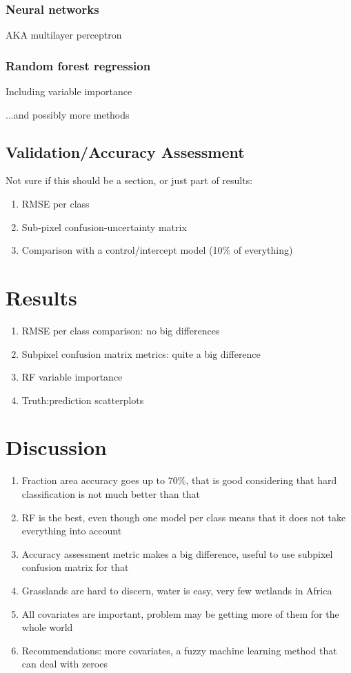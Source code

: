 \documentclass[a4paper,10pt]{article}
\begin{document}
\subsubsection{Neural networks}

AKA multilayer perceptron

\subsubsection{Random forest regression}

Including variable importance

...and possibly more methods

\subsection{Validation/Accuracy Assessment}

Not sure if this should be a section, or just part of results:

\begin{enumerate}
 \item RMSE per class
 \item Sub-pixel confusion-uncertainty matrix
 \item Comparison with a control/intercept model (10\% of everything)
\end{enumerate}

\section{Results}

\begin{enumerate}
 \item RMSE per class comparison: no big differences
 \item Subpixel confusion matrix metrics: quite a big difference
 \item RF variable importance
 \item Truth:prediction scatterplots
\end{enumerate}

\section{Discussion}

\begin{enumerate}
 \item Fraction area accuracy goes up to 70\%, that is good considering that hard classification is not much better than that
 \item RF is the best, even though one model per class means that it does not take everything into account
 \item Accuracy assessment metric makes a big difference, useful to use subpixel confusion matrix for that
 \item Grasslands are hard to discern, water is easy, very few wetlands in Africa
 \item All covariates are important, problem may be getting more of them for the whole world
 \item Recommendations: more covariates, a fuzzy machine learning method that can deal with zeroes
\end{enumerate}
\end{document}

